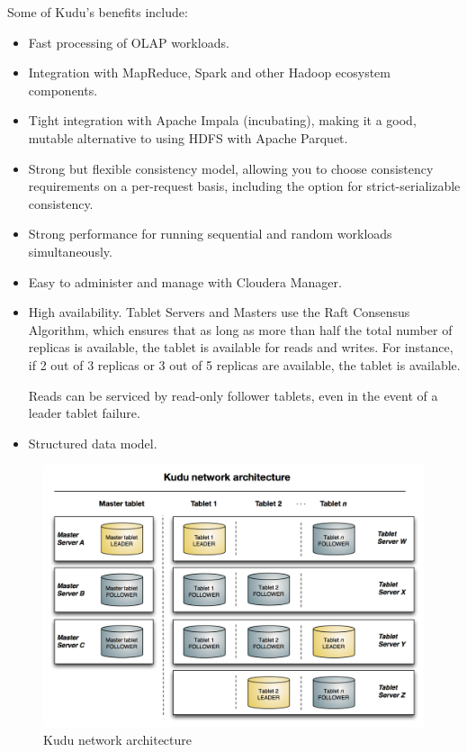 \documentclass[hyperref, UTF-8]{ctexart}
\begin{document}
Some of Kudu’s benefits include:
\begin{itemize}
\item Fast processing of OLAP workloads.
\item Integration with MapReduce, Spark and other Hadoop ecosystem components.
\item Tight integration with Apache Impala (incubating), making it a good, mutable alternative to using HDFS with Apache Parquet.
\item Strong but flexible consistency model, allowing you to choose consistency requirements on a per-request basis, including the option for strict-serializable consistency.
\item Strong performance for running sequential and random workloads simultaneously.
\item Easy to administer and manage with Cloudera Manager.
\item High availability. Tablet Servers and Masters use the Raft Consensus Algorithm, which ensures that as long as more than half the total number of replicas is available, the tablet is available for reads and writes. For instance, if 2 out of 3 replicas or 3 out of 5 replicas are available, the tablet is available.  

Reads can be serviced by read-only follower tablets, even in the event of a leader tablet failure.
\item Structured data model.
\end{itemize}

\begin{figure}[htbp]
\centering
\includegraphics[width=.9\linewidth]{Component/kudu-architecture-2_2017-11-29_17-15-56.png}
\caption{Kudu network architecture}
\end{figure}   
\end{document}
